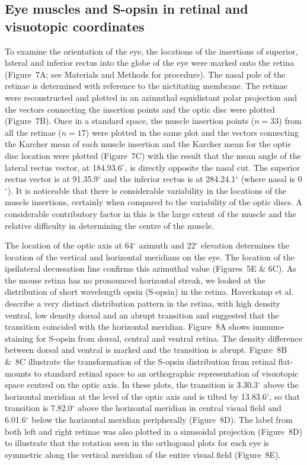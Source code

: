 \documentclass[10pt]{article}
\newcounter{Figure}
\begin{document}
\subsection*{Eye muscles and S-opsin in retinal and visuotopic
coordinates}
To examine the orientation of the eye, the locations of the insertions
of superior, lateral and inferior rectus into the globe of the eye
were marked onto the retina (Figure~7A; see Materials and Methods for
procedure). The nasal pole of the retinae is determined with
reference to the nictitating membrane. The retinae were reconstructed
and plotted in an azimuthal equidistant polar projection and the
vectors connecting the insertion points and the optic disc were
plotted (Figure~7B). Once in a standard space, the muscle insertion
points ($n=33$) from all the retinae ($n=17$) were
plotted in the same plot and the vectors connecting the Karcher mean
of each muscle insertion and the Karcher mean for the optic disc
location were plotted (Figure~7C) with the result that the mean angle
of the lateral rectus vector, at 184.9{\textpm}3.6$^{\circ}$, is directly
opposite the nasal cut. The superior rectus vector is at
91.3{\textpm}5.9$^{\circ}$ and the inferior rectus is at
284.2{\textpm}4.1$^{\circ}$ (where nasal is 0$^{\circ}$). It is noticeable
that there is considerable variability in the locations of the muscle
insertions, certainly when compared to the variability of the optic
discs. A considerable contributory factor in this is the large extent
of the muscle and the relative difficulty in determining the centre
of the muscle.

The location of the optic axis at 64$^{\circ}$ azimuth and 22$^{\circ}$
elevation \cite{OommenStahl2008}  determines the location of the
vertical and horizontal meridians on the eye. The location of the
ipsilateral decussation line confirms this azimuthal value
(Figures~5E \& 6C). As the mouse retina has no pronounced horizontal
streak, we looked at the distribution of short wavelength opsin
(S-opsin) in the retina. Haverkamp et al. \cite{HaverkampEtal2005}
describe a very distinct distribution pattern in the retina, with
high density ventral, low density dorsal and an abrupt transition and
suggested that the transition coincided with the horizontal meridian.
Figure~8A shows immuno-staining for S-opsin from dorsal, central and
ventral retina. The density difference between dorsal and ventral is
marked and the transition is abrupt. Figure~8B \&~8C illustrate the
transformation of the S-opsin distribution from retinal flat-mounts
to standard retinal space to an orthographic representation of
visuotopic space centred on the optic axis. In these plots, the
transition is 3.3{\textpm}0.3$^{\circ}$ above the horizontal meridian at
the level of the optic axis and is tilted by 13.8{\textpm}3.6$^{\circ}$,
so that transition is 7.8{\textpm}2.0$^{\circ}$ above the horizontal
meridian in central visual field and 6.0{\textpm}1.6$^{\circ}$ below the
horizontal meridian peripherally (Figure~8D). The label from both
left and right retinae was also plotted in a sinusoidal projection
(Figure~8D) to illustrate that the rotation seen in the orthogonal
plots for each eye is symmetric along the vertical meridian of the
entire visual field (Figure~8E).
\end{document}
